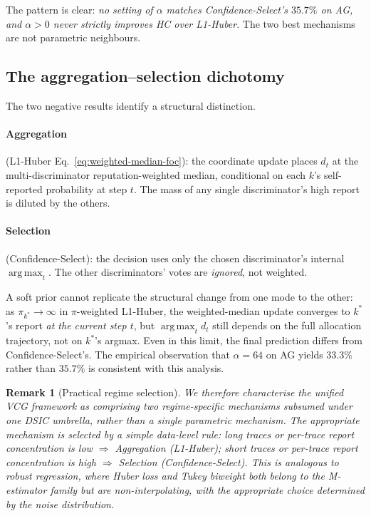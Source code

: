 \documentclass[11pt]{article}
\newtheorem{remark}[theorem]{Remark}
\DeclareMathOperator*{\argmax}{arg\,max}
\begin{document}
The pattern is clear: \emph{no setting of $\alpha$ matches Confidence-Select's
$35.7\%$ on AG, and $\alpha > 0$ never strictly improves HC over L1-Huber}.
The two best mechanisms are not parametric neighbours.

\subsection{The aggregation--selection dichotomy}

The two negative results identify a structural distinction.

\paragraph{Aggregation} (L1-Huber Eq.~\ref{eq:weighted-median-foc}): the
coordinate update places $d_t$ at the multi-discriminator reputation-weighted
median, conditional on each $k$'s self-reported probability at step $t$. The
mass of any single discriminator's high report is diluted by the others.

\paragraph{Selection} (Confidence-Select): the decision uses only the chosen
discriminator's internal $\argmax_t$. The other discriminators' votes are
\emph{ignored}, not weighted.

A soft prior cannot replicate the structural change from one mode to the
other: as $\pi_{k^*} \to \infty$ in $\pi$-weighted L1-Huber, the
weighted-median update converges to $k^*$'s report \emph{at the current
step $t$}, but $\argmax_t d_t$ still depends on the full allocation
trajectory, not on $k^*$'s argmax. Even in this limit, the final prediction
differs from Confidence-Select's. The empirical observation that
$\alpha = 64$ on AG yields $33.3\%$ rather than $35.7\%$ is consistent with
this analysis.

\begin{remark}[Practical regime selection]
We therefore characterise the unified VCG framework as comprising
\emph{two regime-specific mechanisms} subsumed under one DSIC umbrella,
rather than a single parametric mechanism. The appropriate mechanism is
selected by a simple data-level rule:
\emph{long traces or per-trace report concentration is low}
$\Rightarrow$ Aggregation (L1-Huber);
\emph{short traces or per-trace report concentration is high}
$\Rightarrow$ Selection (Confidence-Select).
This is analogous to robust regression, where Huber loss and Tukey biweight
both belong to the M-estimator family but are non-interpolating, with the
appropriate choice determined by the noise distribution.
\end{remark}
\end{document}
